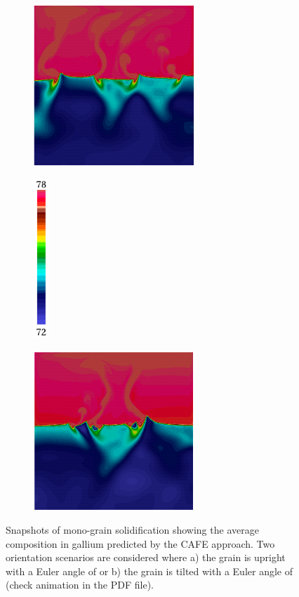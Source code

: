   {%
  \begin{figure}[htbp]
      \begin{subfigure}[t]{0.35\textwidth}
      \includegraphics[height=6cm]{Chapter4/Graphics/freckle_cafe/anim_monograin_upright/img0133.png}%
      \caption{}
        \end{subfigure}
        \hspace{10mm}
        \begin{subfigure}[t]{0.15\textwidth}
        \centering
      \includegraphics[height=6cm]{Chapter4/Graphics/freckle_cafe/cafe_VG_colorbar_annot.pdf}%
        \end{subfigure}
        \begin{subfigure}[t]{0.35\textwidth}
        \centering
      \includegraphics[height=6cm]{Chapter4/Graphics/freckle_cafe/anim_monograin_tilted/img0133.png}%
      \caption{}
        \end{subfigure}
          \caption{Snapshots of mono-grain solidification showing the average composition in gallium predicted by the CAFE approach. 
      Two orientation scenarios are considered where a) the grain is upright with a Euler angle of  
      or b) the grain is tilted with a Euler angle of  (check animation in the PDF file).}
      \label{fig:animate_monograin}
      \end{figure}
  }
